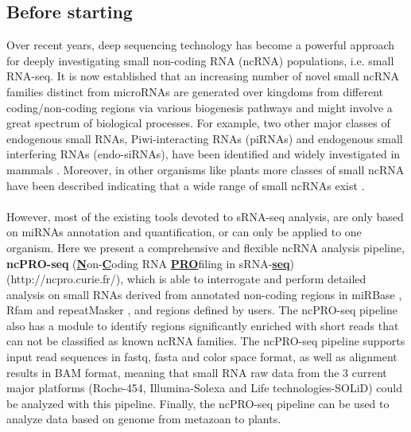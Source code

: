 \documentclass[12pt]{article}
\def \ncpip{ncPRO-seq}
\begin{document}
\subsection{Before starting}
\label{subsection:beforestarting}
Over recent years, deep sequencing technology has become a powerful approach for deeply investigating small non-coding RNA (ncRNA) populations, i.e. small RNA-seq. It is now established that an increasing number of novel small ncRNA families distinct from microRNAs are generated over kingdoms from different coding/non-coding regions via various biogenesis pathways and might involve a great spectrum of biological processes. For example, two other major classes of endogenous small RNAs, Piwi-interacting RNAs (piRNAs) and endogenous small interfering RNAs (endo-siRNAs), have been identified and widely investigated in mammals \cite{Ghildiyal2009}. Moreover, in other organisms like plants more classes of small ncRNA have been described indicating that a wide range of small ncRNAs exist \cite{Brodersen2006}.\\\\
However, most of the existing tools devoted to sRNA-seq analysis, are only based on miRNAs annotation and quantification, or can only be applied to one organism. Here we present a comprehensive and flexible ncRNA analysis pipeline, \textbf{\ncpip{}} (\textbf{\underline{N}}on-\textbf{\underline{C}}oding RNA \textbf{\underline{PRO}}filing in sRNA-\textbf{\underline{seq}}) (http://ncpro.curie.fr/), which is able to interrogate and perform detailed analysis on small RNAs derived from annotated non-coding regions in miRBase \cite{Kozomara2011}, Rfam \cite{Gardner2011} and repeatMasker \cite{Smit2008}, and regions defined by users. The \ncpip{} pipeline also has a module to identify regions significantly enriched with short reads that can not be classified as known ncRNA families. The ncPRO-seq pipeline supports input read sequences in fastq, fasta and color space format, as well as alignment results in BAM format, meaning that small RNA raw data from the 3 current major platforms (Roche-454, Illumina-Solexa and Life technologies-SOLiD) could be analyzed with this pipeline. Finally, the ncPRO-seq pipeline can be used to analyze data based on genome from metazoan to plants.
\end{document}
